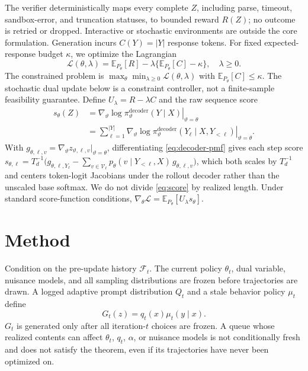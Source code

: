 \documentclass{article}
\begin{document}
The verifier deterministically maps every complete $Z$, including parse,
timeout, sandbox-error, and truncation statuses, to bounded reward $R(Z)$; no
outcome is retried or dropped. Interactive or stochastic environments are
outside the core formulation. Generation incurs $C(Y)=|Y|$ response tokens.
For fixed expected-response budget $\kappa$, we optimize the Lagrangian
\begin{equation}
\mathcal L(\theta,\lambda)=
\mathbb E_{P_\theta}[R]-
\lambda\{\mathbb E_{P_\theta}[C]-\kappa\},
\quad \lambda\ge0.
\label{eq:lagrangian}
\end{equation}
The constrained problem is
$\max_\theta\min_{\lambda\ge0}\mathcal L(\theta,\lambda)$ with
$\mathbb E_{P_\theta}[C]\le\kappa$. The stochastic dual update below is a
constraint controller, not a finite-sample feasibility guarantee.
Define $U_\lambda=R-\lambda C$ and the raw sequence score
\begin{align}
s_\theta(Z)
&=\left.\nabla_\vartheta
\log\pi_\vartheta^{\mathrm{decoder}}(Y\mid X)
\right|_{\vartheta=\theta}\nonumber\\
&=\sum_{\ell=1}^{|Y|}
\left.\nabla_\vartheta\log
\pi_\vartheta^{\mathrm{decoder}}(Y_\ell\mid X,Y_{<\ell})
\right|_{\vartheta=\theta}.
\label{eq:score}
\end{align}
With $g_{\theta,\ell,v}=\nabla_\vartheta z_{\vartheta,\ell,v}|_{\vartheta=\theta}$,
differentiating \cref{eq:decoder-pmf} gives each step score
$s_{\theta,\ell}=T_d^{-1}\big(g_{\theta,\ell,Y_\ell}
-\sum_{v\in\mathcal V_\ell}p_\theta(v\mid Y_{<\ell},X)\,g_{\theta,\ell,v}\big)$,
which both scales by $T_d^{-1}$ and centers token-logit Jacobians under the
rollout decoder rather than the unscaled base softmax.
We do not divide \cref{eq:score} by realized length. Under standard
score-function conditions,
$\nabla_\theta\mathcal L=\mathbb E_{P_\theta}[U_\lambda s_\theta]$.

\section{Method}
\label{sec:method}

Condition on the pre-update history $\mathcal F_t$. The current policy
$\theta_t$, dual variable, nuisance models, and all sampling distributions are
frozen before trajectories are drawn. A logged adaptive prompt distribution
$Q_t$ and a stale behavior policy $\mu_t$ define
\begin{equation}
G_t(z)=q_t(x)\mu_t(y\mid x).
\end{equation}
$G_t$ is generated only after all iteration-$t$ choices are frozen. A queue
whose realized contents can affect $\theta_t$, $q_t$, $\alpha$, or nuisance
models is not conditionally fresh and does not satisfy the theorem, even if
its trajectories have never been optimized on.
\end{document}
